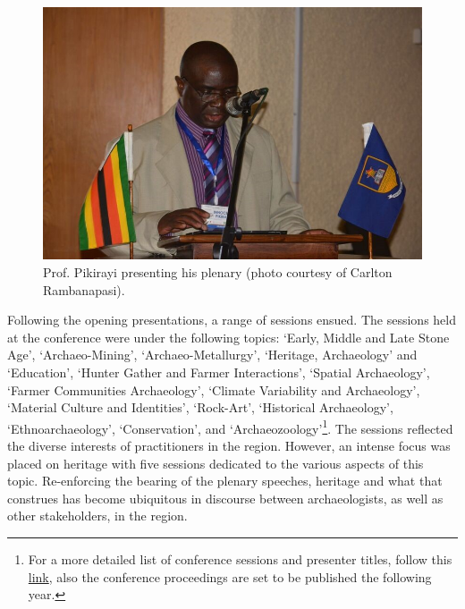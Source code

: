 \begin{figure}
			\includegraphics[width=\linewidth]{figures/asapa_01}%
			\caption{Prof. Pikirayi presenting his plenary (photo courtesy of Carlton Rambanapasi).}
			\label{asapa_01} %
		\end{figure}
	
	Following the opening presentations, a range of sessions ensued. The sessions held at the conference were under the following topics: ‘Early, Middle and Late Stone Age’, ‘Archaeo-Mining’, ‘Archaeo-Metallurgy’, ‘Heritage, Archaeology’ and ‘Education’, ‘Hunter Gather and Farmer Interactions’, ‘Spatial Archaeology’, ‘Farmer Communities Archaeology’, ‘Climate Variability and Archaeology’, ‘Material Culture and Identities’, ‘Rock-Art’, ‘Historical Archaeology’, ‘Ethnoarchaeology’, ‘Conservation’, and ‘Archaeozoology’\footnote{For a more detailed list of conference sessions and presenter titles, follow this \href{http://www.asapa2015.uz.ac.zw/index.php/conference/programme}{link}, also the conference proceedings are set to be published the following year.}. The sessions reflected the diverse interests of practitioners in the region. However, an intense focus was placed on heritage with five sessions dedicated to the various aspects of this topic. Re-enforcing the bearing of the plenary speeches, heritage and what that construes has become ubiquitous in discourse between archaeologists, as well as other stakeholders, in the region.
	
